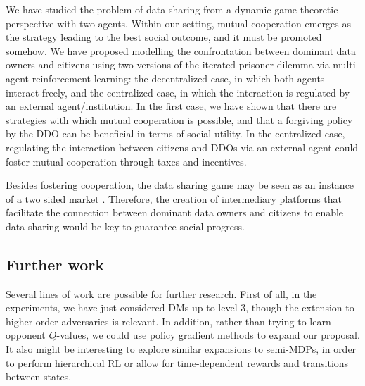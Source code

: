
We have studied the problem of data sharing
from a dynamic game theoretic perspective with two agents.
Within our setting,  mutual cooperation emerges as the strategy 
leading to the best social outcome, and it must be promoted somehow. We
have proposed modelling the confrontation between dominant data owners and citizens using two versions of the iterated prisoner dilemma via  
multi agent reinforcement learning: the decentralized case, in which both agents interact freely, and the centralized case, in which the interaction is regulated by an external agent/institution. In the first case, we have shown that there are strategies with which mutual cooperation is possible, and that a forgiving policy by the DDO can be beneficial in terms of social utility. In the centralized case, regulating the interaction between citizens and DDOs via an external agent could foster mutual cooperation through taxes and incentives.

 Besides fostering cooperation,  the data sharing game may be seen as
  an instance of a two sided market \cite{rochet2006two}. Therefore,
  the creation of intermediary platforms that facilitate the connection between dominant data owners and citizens to enable data sharing
  would be key to guarantee social progress. 
  

\subsection{Further work}

Several lines of work are possible for further research. First of all, in the experiments, we have just considered DMs up to level-3,
though the extension to higher order adversaries is relevant. %
In addition, rather than trying to learn opponent $Q$-values, we could
use policy gradient methods \cite{baxter2000direct} to expand our proposal.
It also might be interesting to explore similar expansions to semi-MDPs, 
in order to perform hierarchical RL or allow for time-dependent rewards 
and transitions between states.